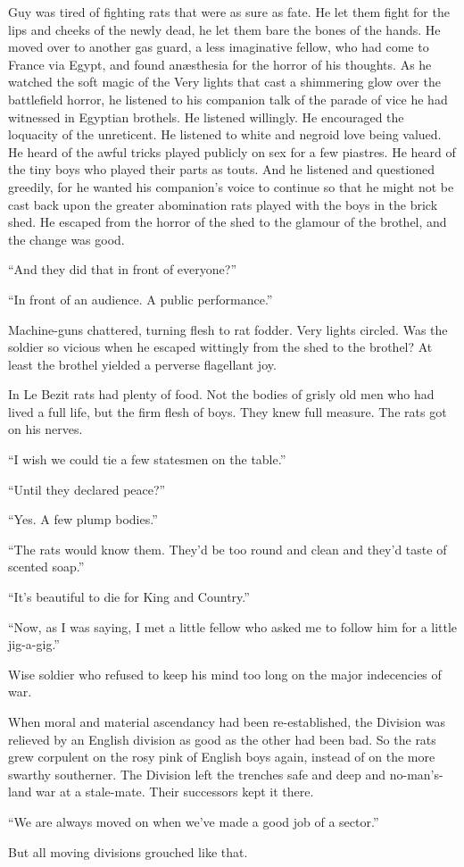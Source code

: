 Guy was tired of fighting rats that were as sure as fate. He let them fight for the lips and cheeks of the newly dead, he let them bare the bones of the hands. He moved over to another gas guard, a less imaginative fellow, who had come to France via Egypt, and found an\ae sthesia for the horror of his thoughts. As he watched the soft magic of the Very lights that cast a shimmering glow over the battlefield horror, he listened to his companion talk of the parade of vice he had witnessed in Egyptian brothels. He listened willingly. He encouraged the loquacity of the unreticent. He listened to white and negroid love being valued. He heard of the awful tricks played publicly on sex for a few piastres. He heard of the tiny boys who played their parts as touts. And he listened and questioned greedily, for he wanted his companion's voice to continue so that he might not be cast back upon the greater abomination rats played with the boys in the brick shed. He escaped from the horror of the shed to the glamour of the brothel, and the change was good.

``And they did that in front of everyone?''

``In front of an audience. A public performance.''

Machine-guns chattered, turning flesh to rat fodder. Very lights circled. Was the soldier so vicious when he escaped wittingly from the shed to the brothel? At least the brothel yielded a perverse flagellant joy.

In Le Bezit rats had plenty of food. Not the bodies of grisly old men who had lived a full life, but the firm flesh of boys. They knew full measure. The rats got on his nerves.

``I wish we could tie a few statesmen on the table.''

``Until they declared peace?''

``Yes. A few plump bodies.''

``The rats would know them. They'd be too round and clean and they'd taste of scented soap.''

``It's beautiful to die for King and Country.''

``Now, as I was saying, I met a little fellow who asked me to follow him for a little jig-a-gig.''

Wise soldier who refused to keep his mind too long on the major indecencies of war.

When moral and material ascendancy had been re-established, the Division was relieved by an English division as good as the other had been bad. So the rats grew corpulent on the rosy pink of English boys again, instead of on the more swarthy southerner. The Division left the trenches safe and deep and no-man's-land war at a stale-mate. Their successors kept it there.

``We are always moved on when we've made a good job of a sector.''

But all moving divisions grouched like that.